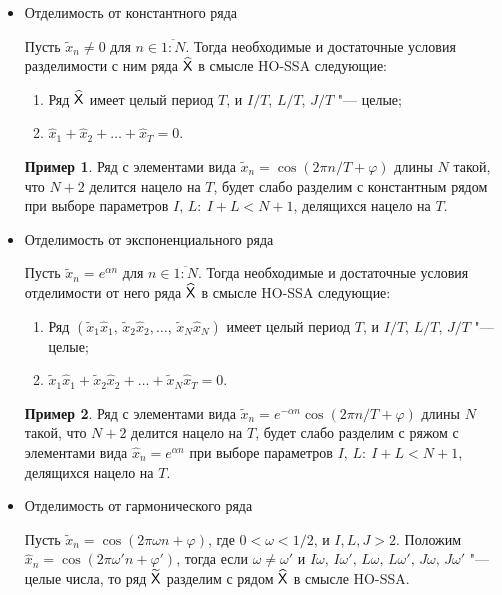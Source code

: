 \documentclass[specialist,
  substylefile=spbu.rtx,
subf,href,colorlinks=true, 12pt]{disser}
\theoremstyle{plain}
\theoremstyle{definition}
\newtheorem{example}{Пример}[section]
\theoremstyle{remark}
\begin{document}
\begin{itemize}
  \item Отделимость от константного ряда

    Пусть $\tilde{x}_n\ne 0$ для $n\in\overline{1:N}$.
    Тогда необходимые и достаточные условия разделимости с ним ряда $\widehat{\mathsf{X}}$ в смысле HO-SSA следующие:
    \begin{enumerate}
      \item Ряд $\widehat{\mathsf{X}}$ имеет целый период $T$, и $I/T$, $L/T$, $J/T$ "--- целые;
      \item $\hat{x}_{1}+\hat{x}_2+\ldots+\hat{x}_T=0$.
    \end{enumerate}
    \begin{example}
      Ряд с элементами вида $\tilde{x}_n=\cos(2\pi n / T + \varphi)$ длины $N$ такой, что $N+2$ делится нацело на
      $T$, будет слабо разделим с константным рядом при выборе параметров $I,\, L:\: I+L< N+1$,
      делящихся нацело на $T$.
    \end{example}
  \item Отделимость от экспоненциального ряда

    Пусть $\tilde{x}_n=e^{\alpha n}$ для $n\in\overline{1:N}$.
    Тогда необходимые и достаточные условия отделимости от него ряда $\widehat{\mathsf{X}}$ в смысле HO-SSA следующие:
    \begin{enumerate}
      \item Ряд $(\tilde{x}_{1}\hat{x}_{1},\, \tilde{x}_{2}\hat{x}_{2},\ldots,\, \tilde{x}_{N}\hat{x}_{N})$
        имеет целый период $T$, и $I/T$, $L/T$, $J/T$ "--- целые;
      \item $\tilde{x}_{1}\hat{x}_{1}+\tilde{x}_{2}\hat{x}_2+\ldots+\tilde{x}_{N}\hat{x}_T=0$.
    \end{enumerate}
    \begin{example}
      Ряд с элементами вида $\tilde{x}_n=e^{-\alpha n}\cos(2\pi n / T + \varphi)$ длины $N$ такой, что $N+2$ делится нацело на
      $T$, будет слабо разделим с ряжом с элементами вида $\hat{x}_n=e^{\alpha n}$ при выборе параметров $I,\, L:\: I+L< N+1$, делящихся нацело на $T$.
    \end{example}
  \item Отделимость от гармонического ряда

    Пусть $\tilde{x}_n=\cos(2\pi \omega n + \varphi)$, где $0 < \omega < 1/2$, и $I, L, J > 2$.
    Положим \linebreak $\hat{x}_n=\cos(2\pi \omega' n + \varphi')$,
    тогда если $\omega\ne\omega'$ и $I\omega,\, I\omega',\, L\omega,\, L\omega',\, J\omega,\, J\omega'$
    "--- целые числа, то ряд $\widetilde{\mathsf{X}}$ разделим с рядом $\widehat{\mathsf{X}}$ в смысле HO-SSA.
\end{itemize}
\end{document}
